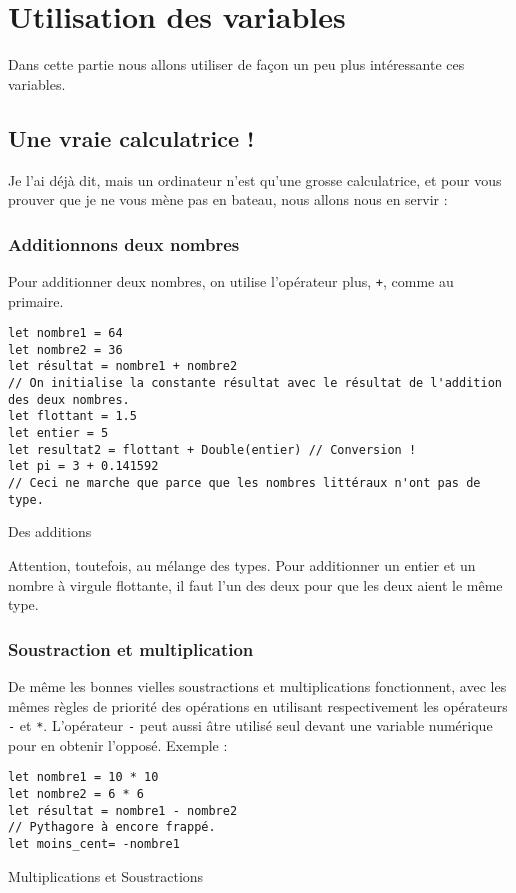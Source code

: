 \chapter{Utilisation des variables}

Dans cette partie nous allons utiliser de façon un peu plus intéressante ces variables.

\section{Une vraie calculatrice !}
Je l'ai déjà dit, mais un ordinateur n'est qu'une grosse calculatrice, et pour vous prouver que
je ne vous mène pas en bateau, nous allons nous en servir :
\subsection{Additionnons deux nombres}
Pour additionner deux nombres, on utilise l'opérateur plus, \verb"+", comme au primaire.
\begin{listing}
\begin{verbatim}
let nombre1 = 64
let nombre2 = 36
let résultat = nombre1 + nombre2
// On initialise la constante résultat avec le résultat de l'addition des deux nombres.
let flottant = 1.5
let entier = 5
let resultat2 = flottant + Double(entier) // Conversion !
let pi = 3 + 0.141592 
// Ceci ne marche que parce que les nombres littéraux n'ont pas de type.
\end{verbatim}
\caption{Des additions}
\end{listing}

Attention, toutefois, au mélange des types. Pour additionner un entier et un nombre à virgule flottante, il faut l'un des deux pour que les deux aient le même type. 
\subsection{Soustraction et multiplication}
De même les bonnes vielles soustractions et multiplications fonctionnent, avec les mêmes règles de priorité des opérations en utilisant respectivement les opérateurs \verb"-" et \verb"*".
L'opérateur \verb"-" peut aussi âtre utilisé seul devant une variable numérique pour en obtenir l'opposé.
Exemple :
\begin{listing}
\begin{verbatim}
let nombre1 = 10 * 10
let nombre2 = 6 * 6
let résultat = nombre1 - nombre2
// Pythagore à encore frappé. 
let moins_cent= -nombre1
\end{verbatim}
\caption{Multiplications et Soustractions}
\end{listing}

